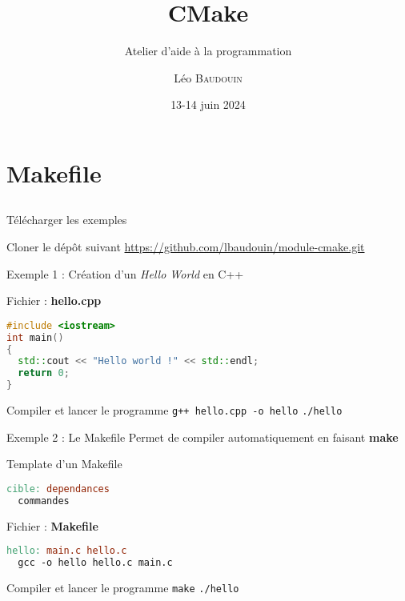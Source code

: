 \documentclass{beamer}
\title{CMake}
\subtitle{Atelier d'aide à la programmation}
\author{L\'eo \textsc{Baudouin}}
\institute{
  {\url{baudouin.leo @ gmail.com}}
}
\date{13-14 juin 2024}
\begin{document}
\begin{frame}
  \titlepage
\end{frame}

\section{Makefile}
\subsection{}

\begin{frame}[fragile]{Télécharger les exemples}
  \begin{block}{Cloner le dép\^ot suivant}
    \url{https://github.com/lbaudouin/module-cmake.git}
  \end{block}
\end{frame}

\begin{frame}[fragile]{Exemple 1 : Création d'un \textit{Hello World} en C++}

  \begin{block}{Fichier : \textbf{hello.cpp}}
  \begin{lstlisting}[language=C++]
#include <iostream>
int main()
{
  std::cout << "Hello world !" << std::endl;
  return 0;
}
\end{lstlisting}
  \end{block}
  \pause

  \begin{block}{Compiler et lancer le programme}
    \textcolor{commandcolor}{\verb?g++ hello.cpp -o hello?}\linebreak
    \textcolor{commandcolor}{\verb?./hello?}
  \end{block}

\end{frame}

\begin{frame}[fragile]{Exemple 2 : Le Makefile}
  Permet de compiler automatiquement en faisant \textbf{make}

  \begin{exampleblock}{Template d'un Makefile}
  \begin{lstlisting}[language=make]
cible: dependances
  commandes
\end{lstlisting}
  \end{exampleblock}
  \pause

  \begin{block}{Fichier : \textbf{Makefile}}
  \begin{lstlisting}[language=make]
hello: main.c hello.c
  gcc -o hello hello.c main.c
\end{lstlisting}
  \end{block}
  \pause

  \begin{block}{Compiler et lancer le programme}
    \textcolor{commandcolor}{\verb?make?}\linebreak
    \textcolor{commandcolor}{\verb?./hello?}
  \end{block}
  
\end{frame}
\end{document}
